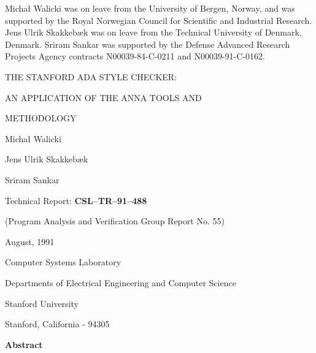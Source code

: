 \vspace{2.8cm}

\hspace*{\coverindent}{\tfb August, 1991}

\vspace{2.8cm}

\hspace*{\coverindent}\parbox[t]{5.9in}
{Micha{\l} Walicki was on leave from the University of Bergen, Norway,
and was supported by the Royal Norwegian Council for Scientific and
Industrial Research.
Jens Ulrik Skakkeb{\ae}k was on leave from the Technical University of
Denmark, Denmark.
Sriram Sankar was supported by the Defense Advanced Research Projects
Agency contracts \mbox{N00039-84-C-0211} and \mbox{N00039-91-C-0162}.
}

\newpage

\setcounter{page}{0}

\vspace*{1.6cm}

\begin{center}
{\tfb
\strut THE STANFORD ADA STYLE CHECKER:\\
\strut AN APPLICATION OF THE ANNA TOOLS AND\\
\strut METHODOLOGY}

\vspace{1.2cm}

{\large\bf
\strut Micha{\l} Walicki\\
\strut Jens Ulrik Skakkeb{\ae}k\\
\strut Sriram Sankar}

\vspace{1.2cm}

{\large Technical Report: {\bf CSL--TR--91--488}}

{\large (Program Analysis and Verification Group Report No. 55)}

\vspace{0.7cm}

{\large August, 1991}

\vspace{0.7cm}

{\large
\strut Computer Systems Laboratory\\
\strut Departments of Electrical Engineering and Computer Science\\
\strut Stanford University\\
\strut Stanford, California - 94305}

\vspace{2cm}

{\large\bf Abstract}
\end{center}

